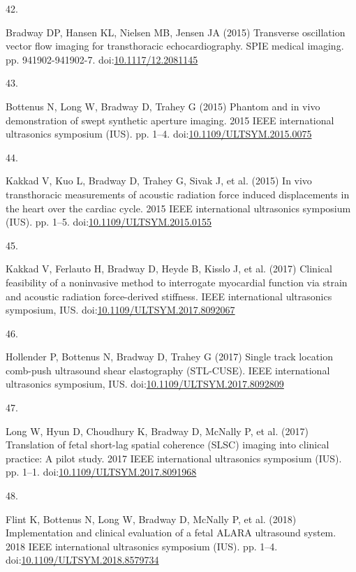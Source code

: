 \documentclass[
]{article}
\newlength{\cslhangindent}
\newlength{\csllabelwidth}
\newenvironment{CSLReferences}[2] %
 {\begin{list}{}{%
  \setlength{\itemindent}{0pt}
  \setlength{\leftmargin}{0pt}
  \setlength{\parsep}{0pt}
  \ifodd #1
   \setlength{\leftmargin}{\cslhangindent}
   \setlength{\itemindent}{-1\cslhangindent}
  \fi
  \setlength{\itemsep}{#2\baselineskip}}}
 {\end{list}}
\newcommand{\CSLLeftMargin}[1]{\parbox[t]{\csllabelwidth}{\strut#1\strut}}
\newcommand{\CSLRightInline}[1]{\parbox[t]{\linewidth - \csllabelwidth}{\strut#1\strut}}
\begin{document}
\begin{CSLReferences}{0}{1}
\CSLLeftMargin{42. }%
\CSLRightInline{Bradway DP, Hansen KL, Nielsen MB, Jensen JA (2015)
{Transverse oscillation vector flow imaging for transthoracic
echocardiography}. SPIE medical imaging. pp. 941902-941902-7.
doi:\href{https://doi.org/10.1117/12.2081145}{10.1117/12.2081145}}

\CSLLeftMargin{43. }%
\CSLRightInline{Bottenus N, Long W, Bradway D, Trahey G (2015) Phantom
and in vivo demonstration of swept synthetic aperture imaging. 2015 IEEE
international ultrasonics symposium (IUS). pp. 1--4.
doi:\href{https://doi.org/10.1109/ULTSYM.2015.0075}{10.1109/ULTSYM.2015.0075}}

\CSLLeftMargin{44. }%
\CSLRightInline{Kakkad V, Kuo L, Bradway D, Trahey G, Sivak J, et al.
(2015) In vivo transthoracic measurements of acoustic radiation force
induced displacements in the heart over the cardiac cycle. 2015 IEEE
international ultrasonics symposium (IUS). pp. 1--5.
doi:\href{https://doi.org/10.1109/ULTSYM.2015.0155}{10.1109/ULTSYM.2015.0155}}

\CSLLeftMargin{45. }%
\CSLRightInline{Kakkad V, Ferlauto H, Bradway D, Heyde B, Kisslo J, et
al. (2017) {Clinical feasibility of a noninvasive method to interrogate
myocardial function via strain and acoustic radiation force-derived
stiffness}. IEEE international ultrasonics symposium, IUS.
doi:\href{https://doi.org/10.1109/ULTSYM.2017.8092067}{10.1109/ULTSYM.2017.8092067}}

\CSLLeftMargin{46. }%
\CSLRightInline{Hollender P, Bottenus N, Bradway D, Trahey G (2017)
{Single track location comb-push ultrasound shear elastography
(STL-CUSE)}. IEEE international ultrasonics symposium, IUS.
doi:\href{https://doi.org/10.1109/ULTSYM.2017.8092809}{10.1109/ULTSYM.2017.8092809}}

\CSLLeftMargin{47. }%
\CSLRightInline{Long W, Hyun D, Choudhury K, Bradway D, McNally P, et
al. (2017) Translation of fetal short-lag spatial coherence (SLSC)
imaging into clinical practice: A pilot study. 2017 IEEE international
ultrasonics symposium (IUS). pp. 1--1.
doi:\href{https://doi.org/10.1109/ULTSYM.2017.8091968}{10.1109/ULTSYM.2017.8091968}}

\CSLLeftMargin{48. }%
\CSLRightInline{Flint K, Bottenus N, Long W, Bradway D, McNally P, et
al. (2018) Implementation and clinical evaluation of a fetal ALARA
ultrasound system. 2018 IEEE international ultrasonics symposium (IUS).
pp. 1--4.
doi:\href{https://doi.org/10.1109/ULTSYM.2018.8579734}{10.1109/ULTSYM.2018.8579734}}


\end{CSLReferences}
\end{document}
